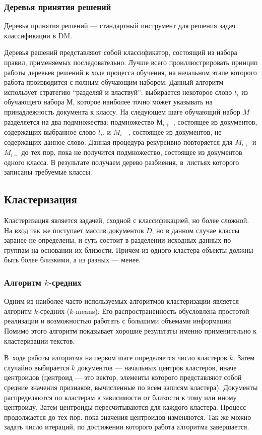 \subsubsection{Деревья принятия решений}

Деревья принятия решений --- стандартный инструмент для решения задач классификации в DM. 

Деревья решений представляют собой классификатор, состоящий из набора правил, применяемых последовательно. 
Лучше всего проиллюстрировать принцип работы деревьев решений в ходе процесса
обучения, на начальном этапе которого работа производится с полным обучающим набором.
Данный алгоритм использует стратегию ``разделяй и властвуй'': 
выбирается некоторое слово $t_i$ из обучающего набора $М$, 
которое наиболее точно может указывать на принадлежность документа к классу. 
На следующем шаге обучающий набор $M$ разделяется на два подмножества:
подмножество $М_{i+}$ , состоящее из документов, содержащих выбранное слово $t_i$, и $M_{i-}$, 
состоящее из документов, не содержащих данное слово. Данная процедура рекурсивно повторяется для $M_{i+}$ и $M_{i-}$
до тех пор, пока не получится подмножество, состоящее из документов одного класса. В результате
получаем дерево разбиения, в~листьях которого записаны требуемые классы.

\subsection{Кластеризация}

Кластеризация является задачей, сходной с классификацией, но более сложной. 
На вход так же поступает массив 
документов $D$, но в данном случае классы заранее не определены, и суть состоит в разделении исходных
данных по группам на основании их близости. 
Причем из одного кластера объекты должны быть более близкими,
а из разных --- менее.

\subsubsection{Алгоритм $k$-средних}

Одним из наиболее часто используемых алгоритмов кластеризации является алгоритм $k$-средних ($k$-means). 
Его распространенность обусловлена простотой реализации и возможностью работать с большими объемами информации.
Помимо этого  алгоритм показывает
хорошие результаты именно применительно к кластеризации текстов. 

В~ходе работы алгоритма на первом шаге определяется число кластеров $k$. 
Затем случайно выбирается $k$ документов --- начальных центров кластеров, иначе центроидов 
(центроид --- это вектор, элементы которого представляют собой средние значения признаков, вычисленные по всем записям кластера). 
Документы распределяются по кластерам в зависимости от близости к тому или иному центроиду. 
Затем центроиды пересчитываются для каждого кластера. 
Процесс продолжается до тех пор, пока значения центроидов изменяются. 
Так же можно задать число итераций, по достижении  которого работа алгоритма завершается.

